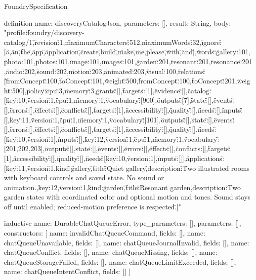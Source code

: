 \begin{lexlean}{FoundrySpecification}
\begin{semanticmodule}
definition{
  name: discoveryCatalogJson,
  parameters: [],
  result: String,
  body: "{\"profile\":\"foundry/discovery-catalog/1\",\"revision\":1,\"maximumCharacters\":512,\"maximumWords\":32,\"ignore\":[\"a\",\"an\",\"the\",\"app\",\"application\",\"create\",\"build\",\"make\",\"me\",\"please\",\"with\",\"and\"],\"words\":{\"gallery\":101,\"photo\":101,\"photos\":101,\"image\":101,\"images\":101,\"garden\":201,\"resonant\":201,\"resonance\":201,\"audio\":202,\"sound\":202,\"motion\":203,\"animated\":203,\"visual\":100},\"relations\":[{\"fromConcept\":100,\"toConcept\":101,\"weight\":500},{\"fromConcept\":100,\"toConcept\":201,\"weight\":500}],\"policy\":{\"cpu\":3,\"memory\":3,\"grants\":[],\"targets\":[1],\"evidence\":[]},\"catalog\":[{\"key\":10,\"version\":1,\"cpu\":1,\"memory\":1,\"vocabulary\":[900],\"outputs\":[7],\"state\":[],\"events\":[],\"errors\":[],\"effects\":[],\"conflicts\":[],\"targets\":[1],\"accessibility\":[],\"quality\":[],\"needs\":[],\"inputs\":[]},{\"key\":11,\"version\":1,\"cpu\":1,\"memory\":1,\"vocabulary\":[101],\"outputs\":[],\"state\":[],\"events\":[],\"errors\":[],\"effects\":[],\"conflicts\":[],\"targets\":[1],\"accessibility\":[],\"quality\":[],\"needs\":[{\"key\":10,\"version\":1}],\"inputs\":[]},{\"key\":12,\"version\":1,\"cpu\":1,\"memory\":1,\"vocabulary\":[201,202,203],\"outputs\":[],\"state\":[],\"events\":[],\"errors\":[],\"effects\":[],\"conflicts\":[],\"targets\":[1],\"accessibility\":[],\"quality\":[],\"needs\":[{\"key\":10,\"version\":1}],\"inputs\":[]}],\"applications\":[{\"key\":11,\"version\":1,\"kind\":\"gallery\",\"title\":\"Quiet gallery\",\"description\":\"Two illustrated rooms with keyboard controls and saved state. No sound or animation.\"},{\"key\":12,\"version\":1,\"kind\":\"garden\",\"title\":\"Resonant garden\",\"description\":\"Two garden states with coordinated color and optional motion and tones. Sound stays off until enabled; reduced-motion preference is respected.\"}]}"
}

inductive{
  name: DurableChatQueueError,
  type_parameters: [],
  parameters: [],
  constructors: [
    {name: invalidChatQueueCommand, fields: []},
    {name: chatQueueUnavailable, fields: []},
    {name: chatQueueJournalInvalid, fields: []},
    {name: chatQueueConflict, fields: []},
    {name: chatQueueMissing, fields: []},
    {name: chatQueueStorageFailed, fields: []},
    {name: chatQueueLimitExceeded, fields: []},
    {name: chatQueueIntentConflict, fields: []}
  ]
}


\end{semanticmodule}
\end{lexlean}
